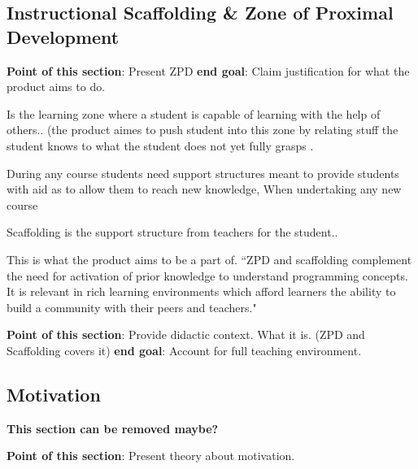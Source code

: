 

\iffalse

\subsection{Instructional Scaffolding & Zone of Proximal Development}
\textbf{Point of this section}: Present ZPD
\textbf{end goal}: Claim justification for what the product aims to do.
\newline

Is the learning zone where a student is capable of learning with the help of others.. (the product aimes to push student into this zone by relating stuff the student knows to what the student does not yet fully grasps \cite{vygotski_1978}.

During any course students need support structures meant to provide students with aid as to allow them to reach new knowledge, 
When undertaking any new course


Scaffolding is the support structure from teachers for the student.. 

This is what the product aims to be a part of.
``ZPD and scaffolding complement the need
for activation of prior knowledge to understand programming concepts. It is relevant in
rich learning environments which afford learners the ability to build a community with
their peers and teachers."  \cite{wood_bruner_ross_1976}



\textbf{Point of this section}: Provide didactic context. What it is. (ZPD and Scaffolding covers it)
\textbf{end goal}: Account for full teaching environment. 
\newline

\subsection{Motivation}
\textbf{This section can be removed maybe?}

\textbf{Point of this section}: Present theory about motivation.

